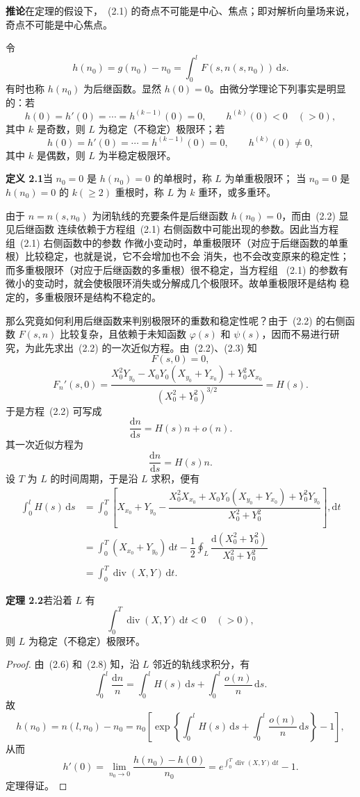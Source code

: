 \noindent\textbf{推论}\quad 在定理的假设下，~(2.1) 的奇点不可能是中心、焦点；即对解析向量场来说，
奇点不可能是中心焦点。

令
\[
  h(n_0)=g(n_0)-n_0=\int_0^lF(s,n(s,n_0))\,\mathrm{d}s.
\]
有时也称 $h(n_0)$ 为后继函数。显然 $h(0)=0$。由微分学理论下列事实是明显的：若
\[
  h(0)=h'(0)=\cdots=h^{(k-1)}(0)=0,\qquad h^{(k)}(0)<0\quad(>0),
\]
其中 $k$ 是奇数，则 $L$ 为稳定（不稳定）极限环；若
\[
  h(0)=h'(0)=\cdots=h^{(k-1)}(0)=0,\qquad h^{(k)}(0)\ne0,
\]
其中 $k$ 是偶数，则 $L$ 为半稳定极限环。

\noindent\textbf{定义 2.1}\quad 当 $n_0=0$ 是 $h(n_0)=0$ 的单根时，称 $L$ 为单重极限环；
当 $n_0=0$ 是 $h(n_0)=0$ 的 $k(\geq2)$ 重根时，称 $L$ 为 $k$ 重环，或多重环。

由于 $n=n(s,n_0)$ 为闭轨线的充要条件是后继函数 $h(n_0)=0$，而由~(2.2) 显见后继函数
连续依赖于方程组~(2.1) 右侧函数中可能出现的参数。因此当方程组~(2.1) 右侧函数中的参数
作微小变动时，单重极限环（对应于后继函数的单重根）比较稳定，也就是说，它不会增加也不会
消失，也不会改变原来的稳定性；而多重极限环（对应于后继函数的多重根）很不稳定，当方程组
~(2.1) 的参数有微小的变动时，就会使极限环消失或分解成几个极限环。故单重极限环是结构
稳定的，多重极限环是结构不稳定的。

那么究竟如何利用后继函数来判别极限环的重数和稳定性呢？由于~(2.2) 的右侧函数 $F(s,n)$
比较复杂，且依赖于未知函数 $\varphi(s)$ 和 $\psi(s)$，因而不易进行研究，为此先求出~(2.2)
的一次近似方程。由~(2.2)、(2.3) 知
\[
  F(s,0)=0,
\]
\[
  F_n'(s,0)=\dfrac{X_0^2Y_{y_0}-X_0Y_0(X_{y_0}+Y_{x_0})+Y_0^2X_{x_0}}
  {(X_0^2+Y_0^2)^{3/2}}=H(s). \tag{2.5}
\]
于是方程~(2.2) 可写成
\[
  \dfrac{\mathrm{d}n}{\mathrm{d}s}=H(s)n+o(n). \tag{2.6}
\]
其一次近似方程为
\[
  \dfrac{\mathrm{d}n}{\mathrm{d}s}=H(s)n. \tag{2.7}
\]
设 $T$ 为 $L$ 的时间周期，于是沿 $L$ 求积，便有
\[
\begin{aligned}
  \int_0^lH(s)\,\mathrm{d}s
  &=\int_0^T\left[X_{x_0}+Y_{y_0}
  -\dfrac{X_0^2X_{x_0}+X_0Y_0(X_{y_0}+Y_{x_0})+Y_0^2Y_{y_0}}
  {X_0^2+Y_0^2}\right],\mathrm{d}t\\
  &=\int_0^T(X_{x_0}+Y_{y_0})\,\mathrm{d}t
  -\dfrac12\oint_L\dfrac{\mathrm{d}(X_0^2+Y_0^2)}{X_0^2+Y_0^2}\\
  &=\int_0^T\operatorname{div}(X,Y)\,\mathrm{d}t.
\end{aligned}
\]

\noindent\textbf{定理 2.2}\quad 若沿着 $L$ 有
\[
  \int_0^T\operatorname{div}(X,Y)\,\mathrm{d}t<0\quad(>0), \tag{2.9}
\]
则 $L$ 为稳定（不稳定）极限环。

\begin{proof}
由~(2.6) 和~(2.8) 知，沿 $L$ 邻近的轨线求积分，有
\[
  \int_0^l\dfrac{\mathrm{d}n}{n}
  =\int_0^lH(s)\,\mathrm{d}s+\int_0^l\dfrac{o(n)}{n}\,\mathrm{d}s.
\]
故
\[
  h(n_0)=n(l,n_0)-n_0
  =n_0\left[\exp\left\{\int_0^lH(s)\,\mathrm{d}s
  +\int_0^l\dfrac{o(n)}{n}\,\mathrm{d}s\right\}-1\right],
\]
从而
\[
  h'(0)=\lim_{n_0\to0}\dfrac{h(n_0)-h(0)}{n_0}
  =e^{\int_0^T\operatorname{div}(X,Y)\,\mathrm{d}t}-1.
\]
定理得证。\qedhere
\end{proof}

